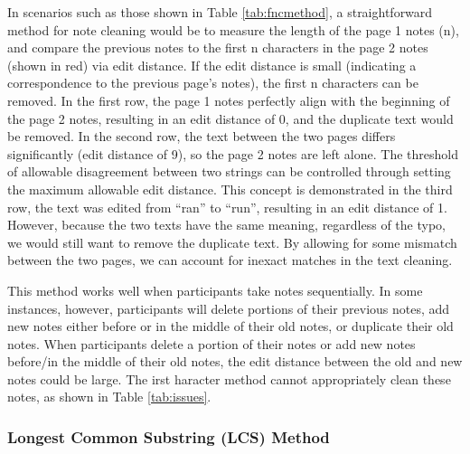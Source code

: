 \documentclass[print]{nuthesis}
\begin{document}
In scenarios such as those shown in Table \ref{tab:fncmethod}, a straightforward method for note cleaning would be to measure the length of the page 1 notes (n), and compare the previous notes to the first n characters in the page 2 notes (shown in red) via edit distance.
If the edit distance is small (indicating a correspondence to the previous page's notes), the first n characters can be removed.
In the first row, the page 1 notes perfectly align with the beginning of the page 2 notes, resulting in an edit distance of 0, and the duplicate text would be removed.
In the second row, the text between the two pages differs significantly (edit distance of 9), so the page 2 notes are left alone.
The threshold of allowable disagreement between two strings can be controlled through setting the maximum allowable edit distance.
This concept is demonstrated in the third row, the text was edited from ``ran'' to ``run'', resulting in an edit distance of 1.
However, because the two texts have the same meaning, regardless of the typo, we would still want to remove the duplicate text.
By allowing for some mismatch between the two pages, we can account for inexact matches in the text cleaning.

This method works well when participants take notes sequentially.
In some instances, however, participants will delete portions of their previous notes, add new notes either before or in the middle of their old notes, or duplicate their old notes.
When participants delete a portion of their notes or add new notes before/in the middle of their old notes, the edit distance between the old and new notes could be large.
The irst  haracter method cannot appropriately clean these notes, as shown in Table \ref{tab:issues}.

\hypertarget{longest-common-substring-lcs-method}{%
\subsubsection{Longest Common Substring (LCS) Method}\label{longest-common-substring-lcs-method}}
\end{document}
